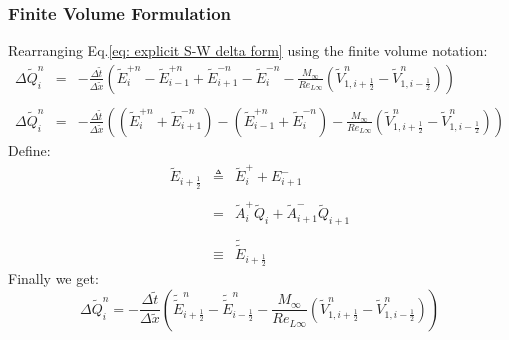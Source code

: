 \documentclass[11pt, a4paper]{article}
\begin{document}
\subsubsection{Finite Volume Formulation}
Rearranging Eq.\ref{eq: explicit S-W delta form} using the finite volume notation:
\begin{equation}
    \begin{array}{lcl}
        \Delta\tilde{Q}_i^n & = & \displaystyle-\frac{\Delta\tilde{t}}{\Delta\tilde{x}}\left(\tilde{E}_i^{+n}-\tilde{E}_{i-1}^{+n}+\tilde{E}_{i+1}^{-n}-\tilde{E}_i^{-n}-\frac{M_\infty}{Re_{L\infty}}\left(\tilde{V}_{1,i+\frac{1}{2}}^{n}-\tilde{V}_{1,i-\frac{1}{2}}^{n}\right)\right) \\\\
        \Delta\tilde{Q}_i^n & = & \displaystyle-\frac{\Delta\tilde{t}}{\Delta\tilde{x}}\left(\left(\tilde{E}_i^{+n}+\tilde{E}_{i+1}^{-n}\right)-\left(\tilde{E}_{i-1}^{+n}+\tilde{E}_i^{-n}\right)-\frac{M_\infty}{Re_{L\infty}}\left(\tilde{V}_{1,i+\frac{1}{2}}^{n}-\tilde{V}_{1,i-\frac{1}{2}}^{n}\right)\right)
    \end{array}
\end{equation}
Define:
\begin{equation}
    \begin{array}{lcl}
        \tilde{E}_{i+\frac{1}{2}} & \triangleq & \tilde{E}_i^++E_{i+1}^- \\\\
        & = & \tilde{A}^+_i\tilde{Q}_i+\tilde{A}^-_{i+1}\tilde{Q}_{i+1} \\\\
        & \equiv & \tilde{\tilde{E}}_{i+\frac{1}{2}}
    \end{array}
\end{equation}
Finally we get:
\begin{equation}
    \Delta\tilde{Q}_i^n=-\frac{\Delta\tilde{t}}{\Delta\tilde{x}}\left(\tilde{\tilde{E}}_{i+\frac{1}{2}}^n-\tilde{\tilde{E}}_{i-\frac{1}{2}}^n-\frac{M_\infty}{Re_{L\infty}}\left(\tilde{V}_{1,i+\frac{1}{2}}^{n}-\tilde{V}_{1,i-\frac{1}{2}}^{n}\right)\right)
    \label{eq: finall explicit S-W}
\end{equation}
\end{document}
